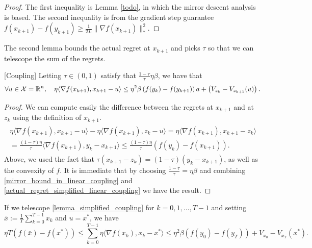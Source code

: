 \begin{proof}
    The first inequality is Lemma \ref{todo}, in which the mirror descent analysis is based. The second inequality is from the gradient step guarantee $f(x_{k+1}) - f(y_{k+1}) \geq \frac{1}{2L}\| \nabla f(x_{k+1})\|^2_\ast$.
\end{proof}

The second lemma bounds the actual regret at $x_{k+1}$ and picks $\tau$ so that we can telescope the sum of the regrets.

\begin{lemma}\label{lemma_simplified_coupling}[Coupling] Letting $\tau \in (0, 1)$ satisfy that $\frac{1-\tau}{\tau}  \eta\beta$, we have that
\[
    \forall u \in \mathcal{X} = \mathbb{R}^n, \quad \eta \langle \nabla f(x_{k+1}), x_{k+1} - u \rangle \leq \eta^2\beta\left( f(y_k) - f(y_{k+1})\right)a + \left( V_{z_k} - V_{z_{k+1}}(u)\right).
\]
\end{lemma}

\begin{proof}
    We can compute easily the difference between the regrets at $x_{k+1}$ and at $z_k$ using the definition of $x_{k+1}$.
    \begin{align}\label{actual_regret_simplified_linear_coupling}
        \begin{aligned}
            \eta \langle \nabla f(x_{k+1}), x_{k+1} - u \rangle - \eta \langle \nabla f(x_{k+1}), z_k - u \rangle = \eta \langle \nabla f(x_{k+1}), x_{k+1} - z_k \rangle  \\
            = \frac{(1-\tau)\eta}{\tau} \langle \nabla f(x_{k+1}), y_k - x_{k+1} \rangle \leq \frac{(1-\tau)\eta}{\tau} (f(y_k) - f(x_{k+1})).
        \end{aligned}
    \end{align}
    Above, we used the fact that $\tau(x_{k+1} - z_k) = (1-\tau)(y_k -x_{k+1})$, as well as the convexity of $f$. It is immediate that by choosing $\frac{1-\tau}{\tau} = \eta \beta$ and combining \ref{mirror_bound_in_linear_coupling} and \ref{actual_regret_simplified_linear_coupling} we have the result.
\end{proof}

If we telescope \ref{lemma_simplified_coupling} for $k= 0, 1, \dots, T-1$ and setting $\bar{x} := \frac{1}{T} \sum_{k=0}^{T-1} x_k$  and $u = x^\ast$, we have
\begin{equation}\label{final_lemma_simplified_coupling}
    \eta T \left( f(\bar{x}) - f(x^\ast) \right)\leq \sum_{k=0}^{T-1} \eta \langle \nabla f(x_k), x_k - x^\ast \rangle \leq \eta^2 \beta \left( f(y_0) - f(y_T) \right) + V_{x_0} - V_{x_T}(x^\ast).
\end{equation}

